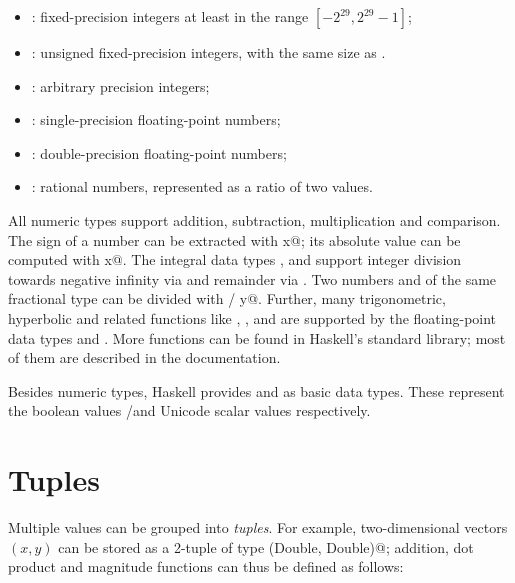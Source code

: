 \documentclass[UdineBachThesis,american,11pt]{PhdThesis}
\begin{document}
  \begin{itemize}
    \item \lstinline@Int@: fixed-precision integers at least in the range
    $\left[-2^{29}, 2^{29} - 1\right]$;

    \item \lstinline@Word@: unsigned fixed-precision integers, with the same
    size as \lstinline@Int@.

    \item \lstinline@Integer@: arbitrary precision integers;

    \item \lstinline@Float@: single-precision floating-point numbers;

    \item \lstinline@Double@: double-precision floating-point numbers;

    \item \lstinline@Rational@: rational numbers, represented as a ratio of two
    \lstinline@Integer@ values.
  \end{itemize}

  All numeric types support addition, subtraction, multiplication and
  comparison. The sign of a number \lstinline@x@ can be extracted with
  \lstinline@signum x@; its absolute value can be computed with
  \lstinline@abs x@. The integral data types \lstinline@Int@, \lstinline@Word@
  and \lstinline@Integer@ support integer division towards negative infinity via
  \lstinline@div@ and remainder via \lstinline@mod@. Two numbers \lstinline@x@
  and \lstinline@y@ of the same fractional type can be divided with
  \lstinline@x / y@. Further, many trigonometric, hyperbolic and related
  functions like \lstinline@sin@, \lstinline@cos@, \lstinline@sqt@ and
  \lstinline@log@ are supported by the floating-point data types
  \lstinline@Float@ and \lstinline@Double@. More functions can be found in
  Haskell's standard library; most of them are described in the documentation.

  Besides numeric types, Haskell provides \lstinline@Bool@ and \lstinline@Char@
  as basic data types. These represent the boolean values
  \lstinline@True@/\lstinline@False@ and Unicode scalar values respectively.

  \section{Tuples}

  Multiple values can be grouped into \emph{tuples}. For example,
  two-dimensional vectors $\left(x, y\right)$ can be stored as a 2-tuple of type
  \lstinline@(Double, Double)@; addition, dot product and magnitude functions
  can thus be defined as follows:
\end{document}
